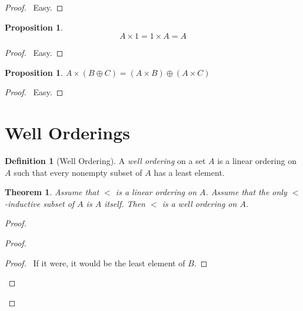 \documentclass{article}
\let\qed\relax
\newtheorem{proposition}[axiom]{Proposition}
\newtheorem{theorem}[axiom]{Theorem}
\theoremstyle{definition}
\newtheorem{definition}[axiom]{Definition}
\newcommand{\seg}{\ensuremath{\operatorname{seg}}}
\begin{document}
    \begin{proof}
        \pf\ Easy. \qed
    \end{proof}

    \begin{proposition}
        \[ A \times 1 = 1 \times A = A \]
    \end{proposition}

    \begin{proof}
        \pf\ Easy. \qed
    \end{proof}

    \begin{proposition}
        $A \times (B \oplus C) = (A \times B) \oplus (A \times C)$
    \end{proposition}

    \begin{proof}
        \pf\ Easy. \qed
    \end{proof}

    \section{Well Orderings}

    \begin{definition}[Well Ordering]
        A \emph{well ordering} on a set $A$ is a linear ordering on $A$ such that every nonempty subset of
        $A$ has a least element.
    \end{definition}

    \begin{theorem}
        Assume that $<$ is a linear ordering on $A$. Assume that the only $<$-inductive subset of $A$ is $A$
        itself. Then $<$ is a well ordering on $A$.
    \end{theorem}

    \begin{proof}
        \pf
        \begin{proof}
            \step{b}{\assume{$\seg t \subseteq A - B$}}
            \begin{proof}
                \pf\ If it were, it would be the least element of $B$.
            \end{proof}
        \end{proof}
        \qed
    \end{proof}
\end{document}
